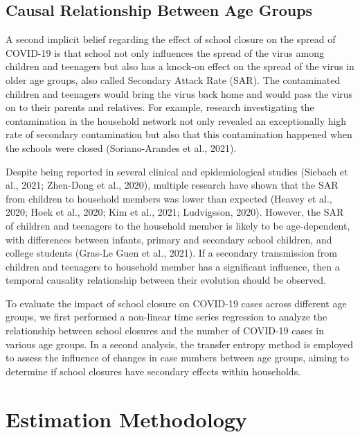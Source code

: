 \documentclass[unnumsec,webpdf,contemporary,large]{oup-authoring-template}%
\theoremstyle{thmstyleone}%
\theoremstyle{thmstyletwo}%
\theoremstyle{thmstylethree}%
\begin{document}
\hypertarget{causal-relationship-between-age-groups}{%
\subsection{Causal Relationship Between Age Groups}\label{causal-relationship-between-age-groups}}

A second implicit belief regarding the effect of school closure on the spread of COVID-19 is that school not only influences the spread of the virus among children and teenagers but also has a knock-on effect on the spread of the virus in older age groups, also called Secondary Attack Rate (SAR). The contaminated children and teenagers would bring the virus back home and would pass the virus on to their parents and relatives. For example, research investigating the contamination in the household network not only revealed an exceptionally high rate of secondary contamination but also that this contamination happened when the schools were closed (Soriano-Arandes et al., 2021).

Despite being reported in several clinical and epidemiological studies (Siebach et al., 2021; Zhen-Dong et al., 2020), multiple research have shown that the SAR from children to household members was lower than expected (Heavey et al., 2020; Hoek et al., 2020; Kim et al., 2021; Ludvigsson, 2020). However, the SAR of children and teenagers to the household member is likely to be age-dependent, with differences between infants, primary and secondary school children, and college students (Gras-Le Guen et al., 2021). If a secondary transmission from children and teenagers to household member has a significant influence, then a temporal causality relationship between their evolution should be observed.

To evaluate the impact of school closure on COVID-19 cases across different age groups, we first performed a non-linear time series regression to analyze the relationship between school closures and the number of COVID-19 cases in various age groups. In a second analysis, the transfer entropy method is employed to assess the influence of changes in case numbers between age groups, aiming to determine if school closures have secondary effects within households.

\hypertarget{estimation-methodology}{%
\section{Estimation Methodology}\label{estimation-methodology}}
\end{document}
